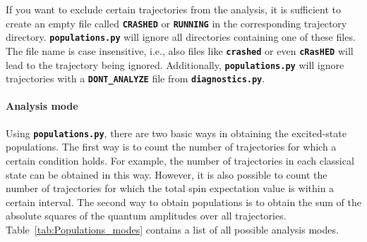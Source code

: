 \documentclass[a4paper,10pt,DIV=15,openany]{scrbook}
\newcommand{\ttt}[1]{\textbf{\texttt{#1}}}
\begin{document}
If you want to exclude certain trajectories from the analysis, it is sufficient to create an empty file called \ttt{CRASHED} or \ttt{RUNNING} in the corresponding trajectory directory. \ttt{populations.py} will ignore all directories containing one of these files. The file name is case insensitive, i.e., also files like \ttt{crashed} or even \ttt{cRasHED} will lead to the trajectory being ignored.
Additionally, \ttt{populations.py} will ignore trajectories with a \ttt{DONT\_ANALYZE} file from \ttt{diagnostics.py}.

\paragraph{Analysis mode}

Using \ttt{populations.py}, there are two basic ways in obtaining the excited-state populations. The first way is to count the number of trajectories for which a certain condition holds. For example, the number of trajectories in each classical state can be obtained in this way. However, it is also possible to count the number of trajectories for which the total spin expectation value is within a certain interval. 
The second way to obtain populations is to obtain the sum of the absolute squares of the quantum amplitudes over all trajectories. Table~\ref{tab:Populations_modes} contains a list of all possible analysis modes.
\end{document}
